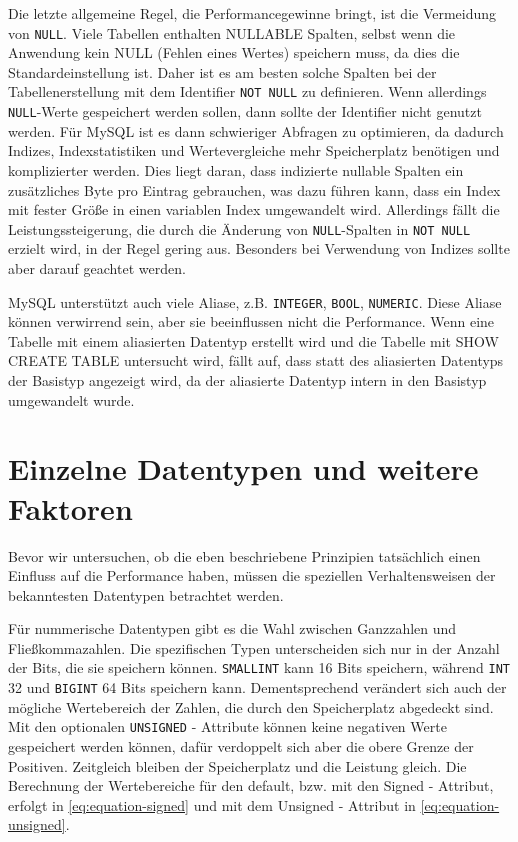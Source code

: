 Die letzte allgemeine Regel, die Performancegewinne bringt, ist die Vermeidung von \texttt{NULL}.
Viele Tabellen enthalten NULLABLE Spalten, selbst wenn die Anwendung kein NULL (Fehlen eines Wertes) speichern muss, da dies die Standardeinstellung ist.
Daher ist es am besten solche Spalten bei der Tabellenerstellung mit dem Identifier \texttt{NOT NULL} zu definieren.
Wenn allerdings \texttt{NULL}-Werte gespeichert werden sollen, dann sollte der Identifier nicht genutzt werden.
Für MySQL ist es dann schwieriger Abfragen zu optimieren, da dadurch Indizes, Indexstatistiken und Wertevergleiche mehr Speicherplatz benötigen und komplizierter werden.
Dies liegt daran, dass indizierte nullable Spalten ein zusätzliches Byte pro Eintrag gebrauchen, was dazu führen kann, dass ein Index mit fester Größe in einen variablen Index umgewandelt wird.
Allerdings fällt die Leistungssteigerung, die durch die Änderung von \texttt{NULL}-Spalten in \texttt{NOT NULL} erzielt wird, in der Regel gering aus.
Besonders bei Verwendung von Indizes sollte aber darauf geachtet werden.

MySQL unterstützt auch viele Aliase, z.B. \texttt{INTEGER}, \texttt{BOOL}, \texttt{NUMERIC}.
Diese Aliase können verwirrend sein, aber sie beeinflussen nicht die Performance.
Wenn eine Tabelle mit einem aliasierten Datentyp erstellt wird und die Tabelle mit SHOW CREATE TABLE untersucht wird, fällt auf, dass statt des aliasierten Datentyps der Basistyp angezeigt wird, da der aliasierte Datentyp intern in den Basistyp umgewandelt wurde.

\section{Einzelne Datentypen und weitere Faktoren}
Bevor wir untersuchen, ob die eben beschriebene Prinzipien tatsächlich einen Einfluss auf die Performance haben, müssen die speziellen Verhaltensweisen der bekanntesten Datentypen betrachtet werden.

Für nummerische Datentypen gibt es die Wahl zwischen Ganzzahlen und Fließkommazahlen.
Die spezifischen Typen unterscheiden sich nur in der Anzahl der Bits, die sie speichern können.
\texttt{SMALLINT} kann 16 Bits speichern, während \texttt{INT} 32 und \texttt{BIGINT} 64 Bits speichern kann.
Dementsprechend verändert sich auch der mögliche Wertebereich der Zahlen, die durch den Speicherplatz abgedeckt sind.
Mit den optionalen \texttt{UNSIGNED} - Attribute können keine negativen Werte gespeichert werden können, dafür verdoppelt sich aber die obere Grenze der Positiven.
Zeitgleich bleiben der Speicherplatz und die Leistung gleich.
Die Berechnung der Wertebereiche für den default, bzw. mit den Signed - Attribut, erfolgt in \ref{eq:equation-signed} und mit dem Unsigned - Attribut in \ref{eq:equation-unsigned}.

